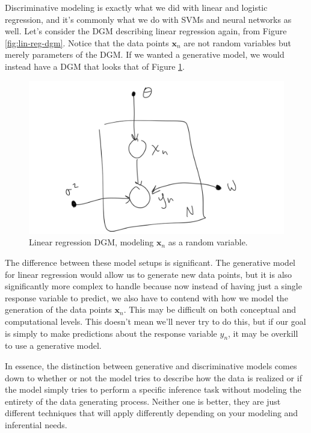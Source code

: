 Discriminative modeling is exactly what we did with linear and logistic regression, and it's commonly what we do with SVMs and neural networks as well. Let's consider the DGM describing linear regression again, from Figure \ref{fig:lin-reg-dgm}. Notice that the data points $\textbf{x}_n$ are not random variables but merely parameters of the DGM. If we wanted a generative model, we would instead have a DGM that looks that of Figure \ref{fig:lin-reg-model-x}.
\begin{figure}
	\centering
	\includegraphics[width=0.5\paperwidth]{../GraphicalModels/fig/lin-reg-model-x.png}
    \caption{Linear regression DGM, modeling $\textbf{x}_n$ as a random variable.}
	\label{fig:lin-reg-model-x}
\end{figure}

The difference between these model setups is significant. The generative model for linear regression would allow us to generate new data points, but it is also significantly more complex to handle because now instead of having just a single response variable to predict, we also have to contend with how we model the generation of the data points $\textbf{x}_n$. This may be difficult on both conceptual and computational levels. This doesn't mean we'll never try to do this, but if our goal is simply to make predictions about the response variable $y_n$, it may be overkill to use a generative model.

In essence, the distinction between generative and discriminative models comes down to whether or not the model tries to describe how the data is realized or if the model simply tries to perform a specific inference task without modeling the entirety of the data generating process. Neither one is better, they are just different techniques that will apply differently depending on your modeling and inferential needs.

